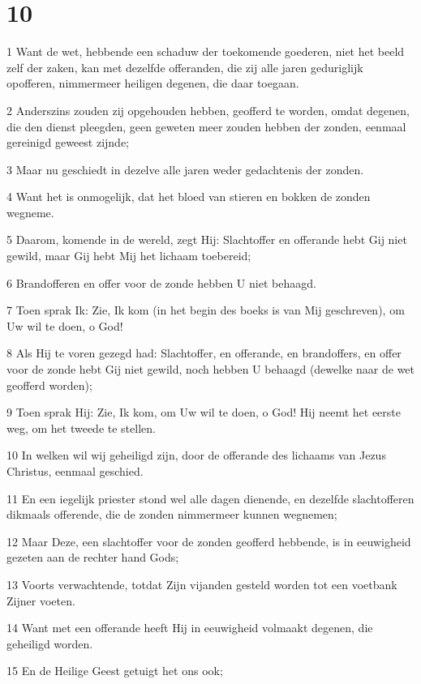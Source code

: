 \chapter{10}

\par 1 Want de wet, hebbende een schaduw der toekomende goederen, niet het beeld zelf der zaken, kan met dezelfde offeranden, die zij alle jaren geduriglijk opofferen, nimmermeer heiligen degenen, die daar toegaan.
\par 2 Anderszins zouden zij opgehouden hebben, geofferd te worden, omdat degenen, die den dienst pleegden, geen geweten meer zouden hebben der zonden, eenmaal gereinigd geweest zijnde;
\par 3 Maar nu geschiedt in dezelve alle jaren weder gedachtenis der zonden.
\par 4 Want het is onmogelijk, dat het bloed van stieren en bokken de zonden wegneme.
\par 5 Daarom, komende in de wereld, zegt Hij: Slachtoffer en offerande hebt Gij niet gewild, maar Gij hebt Mij het lichaam toebereid;
\par 6 Brandofferen en offer voor de zonde hebben U niet behaagd.
\par 7 Toen sprak Ik: Zie, Ik kom (in het begin des boeks is van Mij geschreven), om Uw wil te doen, o God!
\par 8 Als Hij te voren gezegd had: Slachtoffer, en offerande, en brandoffers, en offer voor de zonde hebt Gij niet gewild, noch hebben U behaagd (dewelke naar de wet geofferd worden);
\par 9 Toen sprak Hij: Zie, Ik kom, om Uw wil te doen, o God! Hij neemt het eerste weg, om het tweede te stellen.
\par 10 In welken wil wij geheiligd zijn, door de offerande des lichaams van Jezus Christus, eenmaal geschied.
\par 11 En een iegelijk priester stond wel alle dagen dienende, en dezelfde slachtofferen dikmaals offerende, die de zonden nimmermeer kunnen wegnemen;
\par 12 Maar Deze, een slachtoffer voor de zonden geofferd hebbende, is in eeuwigheid gezeten aan de rechter hand Gods;
\par 13 Voorts verwachtende, totdat Zijn vijanden gesteld worden tot een voetbank Zijner voeten.
\par 14 Want met een offerande heeft Hij in eeuwigheid volmaakt degenen, die geheiligd worden.
\par 15 En de Heilige Geest getuigt het ons ook;
